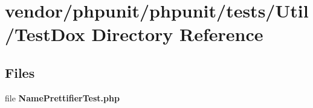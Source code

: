 \section{vendor/phpunit/phpunit/tests/\+Util/\+Test\+Dox Directory Reference}
\label{dir_825d128c64f173e5e21105b308bf762b}
\subsection*{Files}
\begin{DoxyCompactItemize}
\item 
file {\bf Name\+Prettifier\+Test.\+php}
\end{DoxyCompactItemize}
